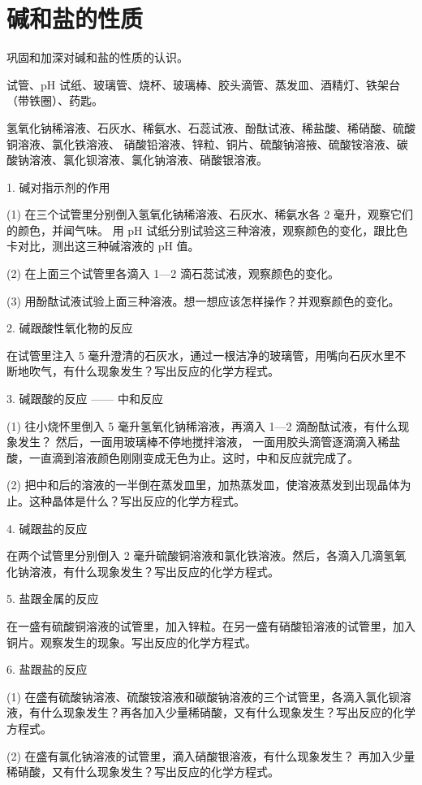 \section{碱和盐的性质}\label{sec:xssy-sy8}

\begin{shiyanmudi}
    巩固和加深对碱和盐的性质的认识。
\end{shiyanmudi}


\begin{shiyanyongpin}
    试管、pH 试纸、玻璃管、烧杯、玻璃棒、胶头滴管、蒸发皿、酒精灯、铁架台（带铁圈）、药匙。

    氢氧化钠稀溶液、石灰水、稀氨水、石蕊试液、酚酞试液、稀盐酸、稀硝酸、硫酸铜溶液、氯化铁溶液、
    硝酸铅溶液、锌粒、铜片、硫酸钠溶掖、硫酸铵溶液、碳酸钠溶液、氯化钡溶液、氯化钠溶液、硝酸银溶液。
\end{shiyanyongpin}


\begin{shiyanbuzhou}
    1. 碱对指示剂的作用

    (1) 在三个试管里分别倒入氢氧化钠稀溶液、石灰水、稀氨水各 2 毫升，观察它们的颜色，并闻气味。
    用 pH 试纸分别试验这三种溶液，观察颜色的变化，跟比色卡对比，测出这三种碱溶液的 pH 值。

    (2) 在上面三个试管里各滴入 1—2 滴石蕊试液，观察颜色的变化。

    (3) 用酚酞试液试验上面三种溶液。想一想应该怎样操作？并观察颜色的变化。

    2. 碱跟酸性氧化物的反应

    在试管里注入 5 毫升澄清的石灰水，通过一根洁净的玻璃管，用嘴向石灰水里不断地吹气，有什么现象发生？写出反应的化学方程式。

    3. 碱跟酸的反应 —— 中和反应

    (1) 往小烧怀里倒入 5 毫升氢氧化钠稀溶液，再滴入 1—2 滴酚酞试液，有什么现象发生？ 然后，一面用玻璃棒不停地搅拌溶液，
    一面用胶头滴管逐滴滴入稀盐酸，一直滴到溶液颜色刚刚变成无色为止。这时，中和反应就完成了。

    (2) 把中和后的溶液的一半倒在蒸发皿里，加热蒸发皿，使溶液蒸发到出现晶体为止。这种晶体是什么？写出反应的化学方程式。

    4. 碱跟盐的反应

    在两个试管里分别倒入 2 毫升硫酸铜溶液和氯化铁溶液。然后，各滴入几滴氢氧化钠溶液，有什么现象发生？写出反应的化学方程式。

    5. 盐跟金属的反应

    在一盛有硫酸铜溶液的试管里，加入锌粒。在另一盛有硝酸铅溶液的试管里，加入铜片。观察发生的现象。写出反应的化学方程式。

    6. 盐跟盐的反应

    (1) 在盛有硫酸钠溶液、硫酸铵溶液和碳酸钠溶液的三个试管里，各滴入氯化钡溶液，有什么现象发生？再各加入少量稀硝酸，又有什么现象发生？写出反应的化学方程式。

    (2) 在盛有氯化钠溶液的试管里，滴入硝酸银溶液，有什么现象发生？ 再加入少量稀硝酸，又有什么现象发生？写出反应的化学方程式。
\end{shiyanbuzhou}



